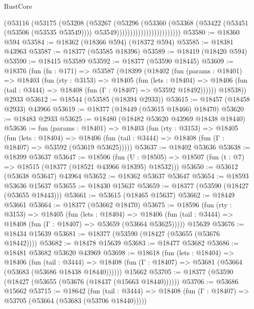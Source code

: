 \begin{lexlean}{RustCore}
\begin{coremodule}
                                      (@53116
                                        (@53175
                                          (@53208
                                            (@53267
                                              (@53296
                                                (@53360
                                                  (@53368
                                                    (@53422 (@53451 (@53506 (@53535 @53549))))
                                                    @53549))))))))))))))))))))))))
@53580 := @18360 @594
@53584 := @18362 (@18366 @594) (@18372 @594)
@53585 := @18381 @43963
@53587 := @18377 (@53585 @18396)
@53589 := @18419 (@18420 @594)
@53590 := @18415 @53589
@53592 := @18377 (@53590 @18445)
@53609 := @18376
    (fun (fn : @171) =>
    @53587
      (@18399
        (@18402
          (fun (params : @18401) =>
          @18403
            (fun (rty : @3153) =>
            @18405
              (fun (lets : @18404) =>
              @18406 (fun (tail : @3444) => @18408 (fun (Γ : @18407) => @53592 @18492))))))
        @18538))
    @2933
@53612 := @18544 (@53585 (@18394 @2933))
@53615 := @18457 (@18458 @2933) @43966
@53619 := @18377 (@18449 (@53615 @18466) @18470)
@53620 := @18483 @2933
@53625 := @18480 (@18482 @53620 @43969 @18438 @18440)
@53636 := fun (params : @18401) =>
  @18403
    (fun (rty : @3153) =>
    @18405
      (fun (lets : @18404) =>
      @18406 (fun (tail : @3444) => @18408 (fun (Γ : @18407) => @53592 (@53619 @53625)))))
@53637 := @18402 @53636
@53638 := @18399 @53637
@53647 := @18506
    (fun (U : @18505) => @18507 (fun (t : @7) => @18515 (@18377 (@18521 @43966 @18395) @18532)))
@53650 := @53612 (@53638 @53647) @43964
@53652 := @18362 @53637 @53647
@53654 := @18593 @53636 @15637
@53655 := @18430 @15637
@53659 := @18377 (@53590 (@18427 (@53655 @18443)))
@53661 := @53615 (@18465 @15637)
@53662 := @18449 @53661
@53664 := @18377 (@53662 @18470)
@53675 := @18596
    (fun (rty : @3153) =>
    @18405
      (fun (lets : @18404) =>
      @18406 (fun (tail : @3444) => @18408 (fun (Γ : @18407) => @53659 (@53664 @53625)))))
    @15639
@53676 := @18434 @15639
@53681 := @18377 (@53590 (@18427 (@53655 (@53676 @18442))))
@53682 := @18478 @15639
@53683 := @18477 @53682
@53686 := @18481 @53682 @53620 @43969
@53698 := @18618
    (fun (lets : @18404) =>
    @18406
      (fun (tail : @3444) =>
      @18408 (fun (Γ : @18407) => @53681 (@53664 (@53683 (@53686 @18438 @18440))))))
    @15662
@53705 := @18377 (@53590 (@18427 (@53655 (@53676 (@18437 (@15663 @18440))))))
@53706 := @53686 @15662
@53715 := @18642
    (fun (tail : @3444) => @18408 (fun (Γ : @18407) => @53705 (@53664 (@53683 (@53706 @18440)))))

\end{coremodule}
\end{lexlean}
